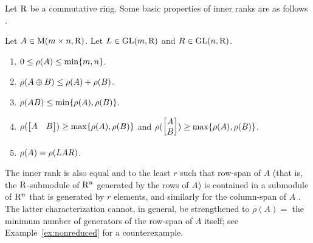 Let $\mathrm{R}$ be a commutative ring. Some basic properties of inner ranks are as follows \cite[pp. 248]{Coh85}. 
\begin{fact}\label{fact:inner-rank}
	Let $A \in \mathrm{M}(m \times n, \mathrm{R})$. Let $L\in\mathrm{GL}(m, \mathrm{R})$ and $R\in\mathrm{GL}(n, \mathrm{R})$. 
	\begin{enumerate}
		\item $0\leq \rho(A) \leq \min\{m,n\}$.
		\item $\rho(A\oplus B)\leq \rho(A)+\rho(B)$.
		\item $\rho(AB)\leq \min\{\rho(A), \rho(B)\}$. 
		\item $\rho(\begin{bmatrix}
			A & B
		\end{bmatrix})\geq \max\{\rho(A), \rho(B)\}$ and $\rho(\begin{bmatrix}
			A \\ B
		\end{bmatrix})\geq \max\{\rho(A), \rho(B)\}$.
		\item $\rho(A)=\rho(LAR)$.
	\end{enumerate}
\end{fact}

The inner rank is also equal %
and 
to the least $r$ such that row-span of $A$ (that is, the $\mathrm{R}$-submodule of $\mathrm{R}^n$ generated by the rows of $A$) is contained in a submodule of $\mathrm{R}^n$ that is generated by $r$ elements, and similarly for the column-span of $A$ \cite[Proposition~5.4.3]{Coh85}. The latter characterization cannot, in general, be strengthened to $\rho(A)=$ the minimum number of generators of the row-span of $A$ itself; see Example~\ref{ex:nonreduced} for a counterexample.



%


